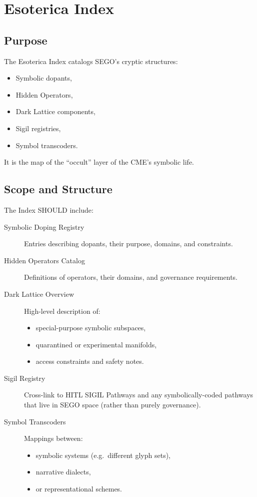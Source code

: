 \chapter{Esoterica Index}
\label{chap:Esoterica_Index}

\section{Purpose}

The Esoterica Index catalogs SEGO's cryptic structures:
\begin{itemize}
    \item Symbolic dopants,
    \item Hidden Operators,
    \item Dark Lattice components,
    \item Sigil registries,
    \item Symbol transcoders.
\end{itemize}

It is the map of the ``occult'' layer of the CME’s symbolic life.

\section{Scope and Structure}

The Index SHOULD include:

\begin{description}
    \item[Symbolic Doping Registry]  
          Entries describing dopants, their purpose, domains, and constraints.

    \item[Hidden Operators Catalog]  
          Definitions of operators, their domains, and governance requirements.

    \item[Dark Lattice Overview]  
          High-level description of:
          \begin{itemize}
              \item special-purpose symbolic subspaces,
              \item quarantined or experimental manifolds,
              \item access constraints and safety notes.
          \end{itemize}

    \item[Sigil Registry]  
          Cross-link to HITL SIGIL Pathways and any symbolically-coded
          pathways that live in SEGO space (rather than purely governance).

    \item[Symbol Transcoders]  
          Mappings between:
          \begin{itemize}
              \item symbolic systems (e.g.\ different glyph sets),
              \item narrative dialects,
              \item or representational schemes.
          \end{itemize}
\end{description}

